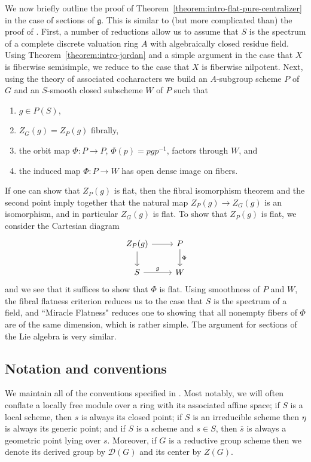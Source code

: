 \documentclass[11pt,reqno]{amsart}
\theoremstyle{definition}
\newcommand{\sD}{{\mathscr D}}
\newcommand{\fg}{\mathfrak{g}}
\begin{document}
We now briefly outline the proof of Theorem~\ref{theorem:intro-flat-pure-centralizer} in the case of sections of $\fg$. This is similar to (but more complicated than) the proof of \cite[Thm.\ 3.10]{Integral-Springer}. First, a number of reductions allow us to assume that $S$ is the spectrum of a complete discrete valuation ring $A$ with algebraically closed residue field. Using Theorem~\ref{theorem:intro-jordan} and a simple argument in the case that $X$ is fiberwise semisimple, we reduce to the case that $X$ is fiberwise nilpotent. Next, using the theory of associated cocharacters we build an $A$-subgroup scheme $P$ of $G$ and an $S$-smooth closed subscheme $W$ of $P$ such that
\begin{enumerate}
    \item $g \in P(S)$,
    \item $Z_G(g) = Z_P(g)$ fibrally,
    \item the orbit map $\Phi: P \to P$, $\Phi(p) = pgp^{-1}$, factors through $W$, and
    \item the induced map $\Phi: P \to W$ has open dense image on fibers.
\end{enumerate}
If one can show that $Z_P(g)$ is flat, then the fibral isomorphism theorem and the second point imply together that the natural map $Z_P(g) \to Z_G(g)$ is an isomorphism, and in particular $Z_G(g)$ is flat. To show that $Z_P(g)$ is flat, we consider the Cartesian diagram
\[
\begin{tikzcd}
Z_P(g) \arrow[r] \arrow[d]
    &P \arrow[d, "\Phi"] \\
S \arrow[r, "g"]
    &W
\end{tikzcd}
\]
and we see that it suffices to show that $\Phi$ is flat. Using smoothness of $P$ and $W$, the fibral flatness criterion reduces us to the case that $S$ is the spectrum of a field, and ``Miracle Flatness" \cite[Thm.\ 23.1]{Matsumura} reduces one to showing that all nonempty fibers of $\Phi$ are of the same dimension, which is rather simple. The argument for sections of the Lie algebra is very similar.

\subsection{Notation and conventions}

We maintain all of the conventions specified in \cite[Sec.\ 1.2]{Integral-Springer}. Most notably, we will often conflate a locally free module over a ring with its associated affine space; if $S$ is a local scheme, then $s$ is always its closed point; if $S$ is an irreducible scheme then $\eta$ is always its generic point; and if $S$ is a scheme and $s \in S$, then $\overline{s}$ is always a geometric point lying over $s$. Moreover, if $G$ is a reductive group scheme then we denote its derived group by $\sD(G)$ and its center by $Z(G)$.
\end{document}
